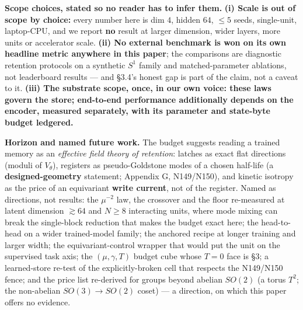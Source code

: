 \documentclass[10pt]{article}
\begin{document}
\textbf{Scope choices, stated so no reader has to infer them.} \textbf{(i) Scale is out of scope by choice:} every number here is dim $4$, hidden $64$, $\le5$ seeds, single-unit, laptop-CPU, and we report \textbf{no} result at larger dimension, wider layers, more units or accelerator scale. \textbf{(ii) No external benchmark is won on its own headline metric anywhere in this paper}; the comparisons are diagnostic retention protocols on a synthetic $S^1$ family and matched-parameter ablations, not leaderboard results --- and \S3.4's honest gap is part of the claim, not a caveat to it. \textbf{(iii) The substrate scope, once, in our own voice: these laws govern the store; end-to-end performance additionally depends on the encoder, measured separately, with its parameter and state-byte budget ledgered.}

\textbf{Horizon and named future work.} The budget suggests reading a trained memory as an \emph{effective field theory of retention}: latches as exact flat directions (moduli of $V_\theta$), registers as pseudo-Goldstone modes of a chosen half-life (a \textbf{designed-geometry} statement; Appendix G, N149/N150), and kinetic isotropy as the price of an equivariant \textbf{write current}, not of the register. Named as directions, not results: the $\mu^{-2}$ law, the crossover and the floor re-measured at latent dimension $\gtrsim64$ and $N\ge8$ interacting units, where mode mixing can break the single-block reduction that makes the budget exact here; the head-to-head on a wider trained-model family; the anchored recipe at longer training and larger width; the equivariant-control wrapper that would put the unit on the supervised task axis; the $(\mu,\gamma,T)$ budget cube whose $T=0$ face is \S3; a learned-store re-test of the explicitly-broken cell that respects the N149/N150 fence; and the price list re-derived for groups beyond abelian $SO(2)$ (a torus $T^2$; the non-abelian $SO(3)\to SO(2)$ coset) --- a direction, on which this paper offers no evidence.


\appendix
\end{document}
